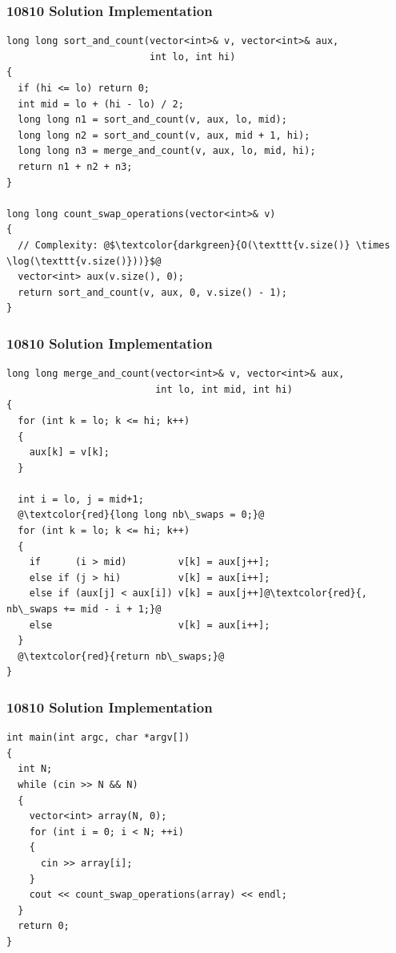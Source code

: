 \documentclass{beamer}
\begin{document}
\begin{frame}[containsverbatim]
\frametitle{10810 Solution Implementation}

\scriptsize

\begin{lstlisting}
long long sort_and_count(vector<int>& v, vector<int>& aux,
                         int lo, int hi)
{
  if (hi <= lo) return 0;
  int mid = lo + (hi - lo) / 2;
  long long n1 = sort_and_count(v, aux, lo, mid);
  long long n2 = sort_and_count(v, aux, mid + 1, hi);
  long long n3 = merge_and_count(v, aux, lo, mid, hi);
  return n1 + n2 + n3;
}

long long count_swap_operations(vector<int>& v)
{
  // Complexity: @$\textcolor{darkgreen}{O(\texttt{v.size()} \times \log(\texttt{v.size()}))}$@
  vector<int> aux(v.size(), 0);
  return sort_and_count(v, aux, 0, v.size() - 1);
}
\end{lstlisting}

\end{frame}

\begin{frame}[containsverbatim]
\frametitle{10810 Solution Implementation}

\scriptsize

\begin{lstlisting}
long long merge_and_count(vector<int>& v, vector<int>& aux,
                          int lo, int mid, int hi)
{
  for (int k = lo; k <= hi; k++)
  {
    aux[k] = v[k];
  }

  int i = lo, j = mid+1;
  @\textcolor{red}{long long nb\_swaps = 0;}@
  for (int k = lo; k <= hi; k++)
  {
    if      (i > mid)         v[k] = aux[j++];
    else if (j > hi)          v[k] = aux[i++];
    else if (aux[j] < aux[i]) v[k] = aux[j++]@\textcolor{red}{, nb\_swaps += mid - i + 1;}@
    else                      v[k] = aux[i++];
  }
  @\textcolor{red}{return nb\_swaps;}@
}
\end{lstlisting}

\end{frame}

\begin{frame}[containsverbatim]
\frametitle{10810 Solution Implementation}

\scriptsize

\begin{lstlisting}
int main(int argc, char *argv[])
{
  int N;
  while (cin >> N && N)
  {
    vector<int> array(N, 0);
    for (int i = 0; i < N; ++i)
    {
      cin >> array[i];
    }
    cout << count_swap_operations(array) << endl;
  }
  return 0;
}
\end{lstlisting}

\end{frame}
\end{document}
